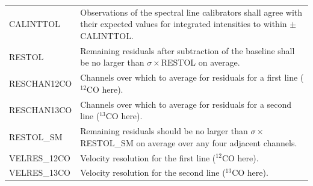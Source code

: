 \documentclass[11pt,oneside,chapters]{starlink}
\begin{document}
\begin{table}[h!]
\begin{tabular}{|p{4.0cm}|p{11.0cm}|}
CALINTTOL      & Observations of the spectral line calibrators shall agree with
                 their expected values for integrated intensities to within
                 $\pm$CALINTTOL. \\
RESTOL         & Remaining residuals after subtraction of the baseline shall be
                 no larger than $\sigma\times$RESTOL on average. \\
RESCHAN12CO    & Channels over which to average for residuals for a first line
                 ($^{12}$CO here).\\
RESCHAN13CO    & Channels over which to average for residuals for a second line
                 ($^{13}$CO here).\\
RESTOL\_SM     & Remaining residuals should be no larger than
                 $\sigma\times$RESTOL\_SM on average over any four adjacent
                 channels. \\
VELRES\_12CO   & Velocity resolution for the first line ($^{12}$CO here). \\
VELRES\_13CO   & Velocity resolution for the second line ($^{13}$CO here). \\
\hline
\end{tabular}
\end{table}
\end{document}
